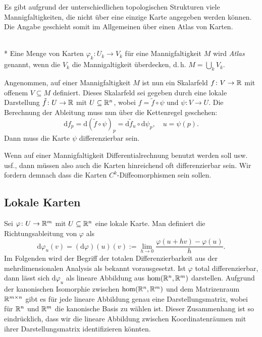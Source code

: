 Es gibt aufgrund der unterschiedlichen topologischen Strukturen
viele Mannigfaltigkeiten, die nicht über eine einzige Karte
angegeben werden können. Die Angabe geschieht somit im
Allgemeinen über einen Atlas von Karten.

\begin{definition}[Atlas]\mbox{}\\*
Eine Menge von Karten $\varphi_k\colon U_k\to V_k$ für eine
Mannigfaltigkeit $M$ wird \emph{Atlas} genannt, wenn die
$V_k$ die Mannigaltigkeit überdecken, d.\,h. $M=\bigcup_k V_k$.
\end{definition}

\noindent
Angenommen, auf einer Mannigfaltigkeit $M$ ist nun ein Skalarfeld
$f\colon V\to\mathbb R$ mit offenem $V\subseteq M$ definiert. Dieses
Skalarfeld sei gegeben durch eine lokale Darstellung
$\tilde f\colon U\to\mathbb R$ mit $U\subseteq\mathbb R^n$, wobei
$f=\tilde f\circ\psi$ und $\psi\colon V\to U$.
Die Berechnung der Ableitung muss nun über die Kettenregel
geschehen:
\begin{equation}
\mathrm df_p = \mathrm d(\tilde f\circ\psi)_p
= \mathrm d\tilde f_u\circ\mathrm d\psi_p,
\quad u = \psi(p).
\end{equation}
Dann muss die Karte $\psi$ differenzierbar sein.

Wenn auf einer Mannigfaltigkeit Differentialrechnung benutzt
werden soll usw. usf., dann müssen also auch die Karten hinreichend oft
differenzierbar sein. Wir fordern demnach dass die Karten
$C^k$-Diffeomorphismen sein sollen.


\subsection{Lokale Karten}

Sei $\varphi\colon U\to\mathbb R^m$ mit $U\subseteq\mathbb R^n$ eine lokale Karte.
Man definiert die Richtungsableitung von $\varphi$ als
\begin{equation}
\mathrm d\varphi_u(v) = (\mathrm d\varphi)(u)(v)
:= \lim_{h\to 0}\frac{\varphi(u+hv)-\varphi(u)}{h}.
\end{equation}
Im Folgenden wird der Begriff der totalen Differenzierbarkeit
aus der mehrdimensionalen Analysis als bekannt vorausgesetzt.
Ist $\varphi$ total differenzierbar, dann lässt sich
$\mathrm d\varphi_u$ als lineare Abbildung aus $\hom(\mathbb R^n,\mathbb R^m)$
darstellen. Aufgrund der kanonischen Isomorphie zwischen
$\hom(\mathbb R^n,\mathbb R^m)$ und dem Matrizenraum $\mathbb R^{m\times n}$ gibt
es für jede lineare Abbildung genau eine Darstellungsmatrix,
wobei für $\mathbb R^n$ und $\mathbb R^m$ die kanonische Basis zu wählen ist.
Dieser Zusammenhang ist so eindrücklich, dass wir die lineare
Abbildung zwischen Koordinatenräumen mit ihrer Darstellungsmatrix
identifizieren könnten.

